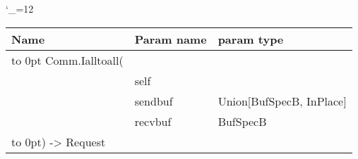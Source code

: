 \begingroup \catcode`\_=12 \tt
\begin{tabular}{lll}
\toprule
\textrm{Name}&\textrm{Param name}&\textrm{param type}\\
\midrule
\hbox to 0pt {Comm.Ialltoall(\hss}\\
& self\\
& sendbuf & Union[BufSpecB, InPlace]\\
& recvbuf & BufSpecB\\
\hbox to 0pt{) -> Request\hss}\\
\bottomrule
\end{tabular}
\endgroup
